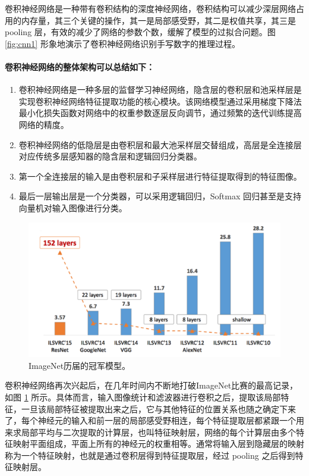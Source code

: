 \documentclass[a4paper]{zreport}
\begin{document}
卷积神经网络是一种带有卷积结构的深度神经网络，卷积结构可以减少深层网络占用的内存量，其三个关键的操作，其一是局部感受野，其二是权值共享，其三是 pooling 层，有效的减少了网络的参数个数，缓解了模型的过拟合问题。图 \ref{fig:cnn1} 形象地演示了卷积神经网络识别手写数字的推理过程。

\paragraph{卷积神经网络的整体架构可以总结如下：}

\begin{enumerate}
\item 卷积神经网络是一种多层的监督学习神经网络，隐含层的卷积层和池采样层是实现卷积神经网络特征提取功能的核心模块。该网络模型通过采用梯度下降法最小化损失函数对网络中的权重参数逐层反向调节，通过频繁的迭代训练提高网络的精度。
\item 卷积神经网络的低隐层是由卷积层和最大池采样层交替组成，高层是全连接层对应传统多层感知器的隐含层和逻辑回归分类器。
\item 第一个全连接层的输入是由卷积层和子采样层进行特征提取得到的特征图像。
\item 最后一层输出层是一个分类器，可以采用逻辑回归，Softmax 回归甚至是支持向量机对输入图像进行分类。
\end{enumerate}

\begin{figure}[h]
\centering
\includegraphics[width=0.85\linewidth]{figures/imagenet}
\caption{ImageNet历届的冠军模型。}
\label{fig:imagenet}
\end{figure}

卷积神经网络再次兴起后，在几年时间内不断地打破ImageNet比赛的最高记录，如图 \ref{fig:imagenet} 所示。具体而言，输入图像统计和滤波器进行卷积之后，提取该局部特征，一旦该局部特征被提取出来之后，它与其他特征的位置关系也随之确定下来了，每个神经元的输入和前一层的局部感受野相连，每个特征提取层都紧跟一个用来求局部平均与二次提取的计算层，也叫特征映射层，网络的每个计算层由多个特征映射平面组成，平面上所有的神经元的权重相等。通常将输入层到隐藏层的映射称为一个特征映射，也就是通过卷积层得到特征提取层，经过 pooling 之后得到特征映射层。
\end{document}
